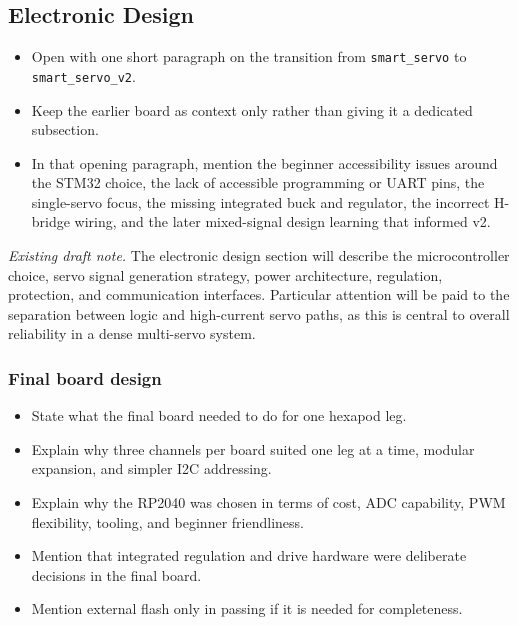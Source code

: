 \subsection{Electronic Design}
\begin{itemize}[label=\textcolor{red}{\textbullet}, before=\color{red}]
  \item Open with one short paragraph on the transition from \texttt{smart\_servo} to \texttt{smart\_servo\_v2}.
  \item Keep the earlier board as context only rather than giving it a dedicated subsection.
  \item In that opening paragraph, mention the beginner accessibility issues around the STM32 choice, the lack of accessible programming or UART pins, the single-servo focus, the missing integrated buck and regulator, the incorrect H-bridge wiring, and the later mixed-signal design learning that informed v2.
\end{itemize}

\noindent\textit{Existing draft note.} The electronic design section will describe the microcontroller choice, servo signal generation strategy, power architecture, regulation, protection, and communication interfaces. Particular attention will be paid to the separation between logic and high-current servo paths, as this is central to overall reliability in a dense multi-servo system.

\subsubsection{Final board design}
\begin{itemize}[label=\textcolor{red}{\textbullet}, before=\color{red}]
  \item State what the final board needed to do for one hexapod leg.
  \item Explain why three channels per board suited one leg at a time, modular expansion, and simpler I2C addressing.
  \item Explain why the RP2040 was chosen in terms of cost, ADC capability, PWM flexibility, tooling, and beginner friendliness.
  \item Mention that integrated regulation and drive hardware were deliberate decisions in the final board.
  \item Mention external flash only in passing if it is needed for completeness.
\end{itemize}

